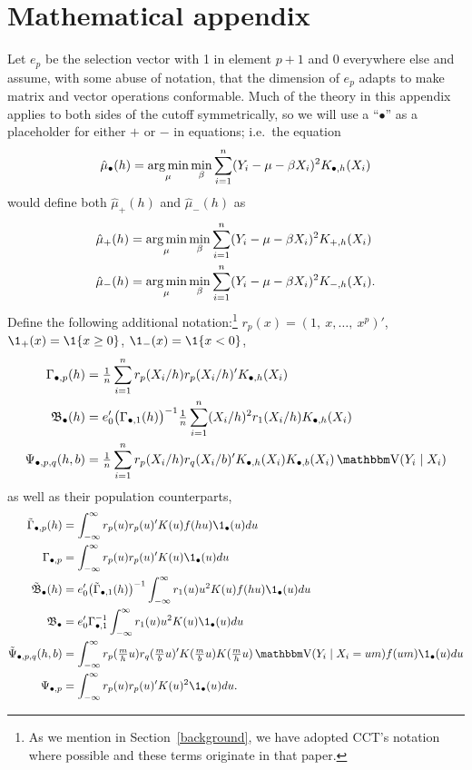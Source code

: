 \documentclass[12pt,fleqn]{article}
\begin{document}
\section{Mathematical appendix}
Let $e_p$ be the selection vector with 1 in element $p+1$ and 0
everywhere else and assume, with some abuse of notation, that the
dimension of $e_p$ adapts to make matrix and vector operations
conformable. Much of the theory in this appendix applies to both
sides of the cutoff symmetrically, so we will use a ``$\bullet$'' as a
placeholder for either $+$ or $-$ in equations; i.e.\ the equation
\[
  \hat\mu_\bullet(h) = \operatorname*{arg\,min}_{\mu} \min_{\beta} \sum_{i=1}^n
  (Y_i - \mu - \beta X_i)^2 K_{\bullet,h}(X_i)
\]
would define both $\hat\mu_+(h)$ and $\hat\mu_-(h)$ as
\begin{align*}
  \hat\mu_+(h) &= \operatorname*{arg\,min}_{\mu} \min_{\beta} \sum_{i=1}^n
  (Y_i - \mu - \beta X_i)^2 K_{+,h}(X_i) \\
  \hat\mu_-(h) &= \operatorname*{arg\,min}_{\mu} \min_{\beta} \sum_{i=1}^n
  (Y_i - \mu - \beta X_i)^2 K_{-,h}(X_i).
\end{align*}
Define the following additional notation:\footnote{%
  As we mention in Section~\ref{background}, we have adopted CCT's
  notation where possible and these terms originate in that paper.} %
$r_p(x) = (1,\ x,\dots,\ x^p)'$, $\1_+(x) = \1\{x \geq 0\}$, $\1_-(x) = \1\{x < 0\}$,
\begin{align*}
  \Gamma_{\bullet,p}(h)
  &= \tfrac{1}{n} \sum_{i=1}^n r_p(X_i/h) r_p(X_i/h)' K_{\bullet,h}(X_i) \\
  \Bf_\bullet(h)
  & = e_0' \big(\Gamma_{\bullet,1}(h)\big)^{-1}
    \tfrac{1}{n} \sum_{i=1}^n (X_i / h)^2 r_1(X_i/h) K_{\bullet,h}(X_i) \\
  \Psi_{\bullet,p,q}(h,b)
  &= \tfrac{1}{n} \sum_{i=1}^n r_p(X_i/h) r_q(X_i/b)'
     K_{\bullet,h}(X_i) K_{\bullet,b}(X_i) \V(Y_i \mid X_i)
\end{align*}
as well as their population counterparts,
\begin{align*}
  \Gammat_{\bullet,p}(h) &= \int_{-\infty}^\infty   r_p(u) r_p(u)' K(u) f(h u) \1_\bullet(u) du \\
  \Gamma_{\bullet,p} &= \int_{-\infty}^\infty   r_p(u) r_p(u)' K(u) \1_\bullet(u) du \\
  \Bft_\bullet(h) & = e_0' \big(\Gammat_{\bullet,1}(h)\big)^{-1}
    \int_{-\infty}^\infty r_1(u) u^2 K(u) f(h u) \1_\bullet(u) du \\
  \Bf_\bullet & = e_0' \Gamma_{\bullet,1}^{-1} \int_{-\infty}^\infty r_1(u) u^2 K(u) \1_\bullet(u) du \\
  \Psit_{\bullet,p,q}(h,b) &= \int_{-\infty}^\infty
     r_p(\tfrac{m}{h} u) r_q(\tfrac{m}{b} u)' K(\tfrac{m}{b} u) K(\tfrac{m}{h} u)
     \V(Y_i \mid X_i = um) f(um) \1_\bullet(u) du \\
  \Psi_{\bullet,p} &= \int_{-\infty}^\infty
     r_p(u) r_p(u)' K(u)^2 \1_\bullet(u) du.
\end{align*}
\end{document}
